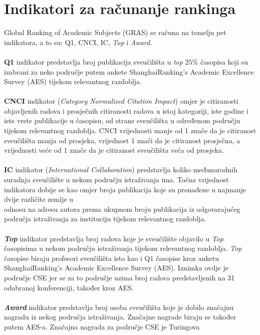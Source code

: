 \documentclass[times, utf8, zavrsni]{fer}
\begin{document}
\section{Indikatori za računanje rankinga}
\label{indikatori}
Global Ranking of Academic Subjects (GRAS) se računa na temelju pet indikatora, a to su: Q1, CNCI, IC, \emph{Top} i \emph{Award}.
\\ \\\textbf{Q1} indikator predstavlja broj publikacija sveučilišta u \emph{top} $25\%$ časopisa koji su izabrani za neko područje putem ankete ShanghaiRanking’s Academic Excellence Survey
(AES) tijekom relevantnog razdoblja.   
\\ \\\textbf{CNCI} indikator (\emph{Category Normalized Citation Impact}) omjer je citiranosti \\objavljenih radova i prosječnih citiranosti 
radova u istoj kategoriji, iste godine i iste vrste publikacije u časopisu, od strane sveučilišta u određenom području tijekom relevantnog razdoblja.
CNCI vrijednosti manje od 1 znače da je citiranost sveučilišta manja od prosjeka, vrijednost 1 znači da je citiranost prosječna, a vrijednosti veće od
1 znače da je citiranost sveučilišta veća od prosjeka.
\\ \\\textbf{IC} indikator (\emph{International Collaboration}) predstavlja koliko međunarodnih suradnja sveučilište u nekom području istraživanja ima.
Točna vrijednost indikatora dobije se kao omjer broja publikacija koje su pronađene u najmanje dvije različite zemlje 
u \\odnosu na adresu autora prema ukupnom broju publikacija iz odgovarajućeg područja istraživanja za instituciju tijekom relevantnog razdoblja.
\\ \\\textbf{\emph{Top}} indikator predstavlja broj radova koje je sveučilište 
objavilo u \emph{Top} časopisima u nekom području istraživanja tijekom relevantnog razdoblja.
\emph{Top} časopise biraju profesori sveučilišta isto kao i Q1 časopise kroz anketu ShanghaiRanking’s Academic Excellence Survey (AES). 
Iznimka ovdje je područje CSE jer se za to područje uzima broj radova predstavljenih na 31 odabranoj konferenciji, 
također kroz AES.
\\ \\\textbf{\emph{Award}} indikator predstavlja broj osoba sveučilišta koje je dobilo značajnu nagradu iz nekog područja istraživanja. Značajne nagrade 
biraju se također putem AES-a. Značajna nagrada za područje CSE je Turingova 
\end{document}
